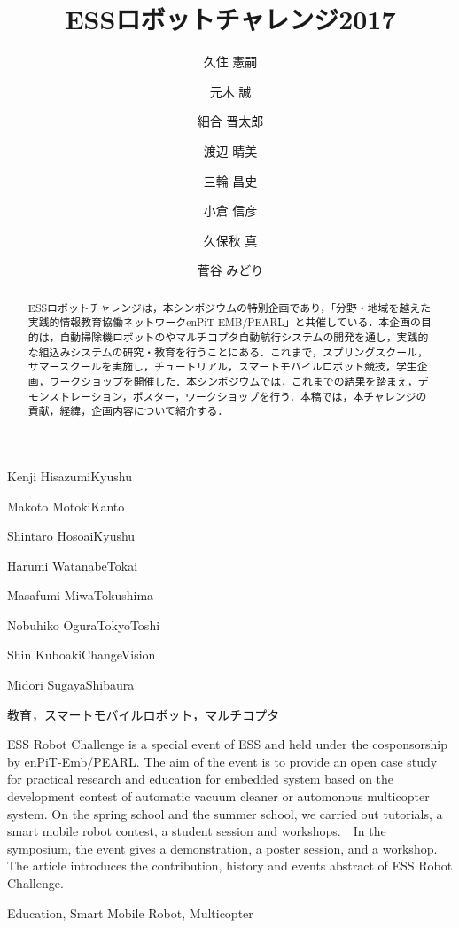 \documentclass[submit]{ipsj}
\begin{document}
\title{ESSロボットチャレンジ2017}



\author{久住 憲嗣}{Kenji Hisazumi}{Kyushu}
\author{元木 誠}{Makoto Motoki}{Kanto}
\author{細合 晋太郎}{Shintaro Hosoai}{Kyushu}
\author{渡辺 晴美}{Harumi Watanabe}{Tokai}
\author{三輪 昌史}{Masafumi Miwa}{Tokushima}
\author{小倉 信彦}{Nobuhiko Ogura}{TokyoToshi}
\author{久保秋 真}{Shin Kuboaki}{ChangeVision}
\author{菅谷 みどり}{Midori Sugaya}{Shibaura}


\begin{abstract}
ESSロボットチャレンジは，本シンポジウムの特別企画であり，「分野・地域を越えた実践的情報教育協働ネットワークenPiT-EMB/PEARL」と共催している．本企画の目的は，自動掃除機ロボットのやマルチコプタ自動航行システムの開発を通し，実践的な組込みシステムの研究・教育を行うことにある．これまで，スプリングスクール，サマースクールを実施し，チュートリアル，スマートモバイルロボット競技，学生企画，ワークショップを開催した．本シンポジウムでは，これまでの結果を踏まえ，デモンストレーション，ポスター，ワークショップを行う．本稿では，本チャレンジの貢献，経緯，企画内容について紹介する．
\end{abstract}

\begin{jkeyword}
教育，スマートモバイルロボット，マルチコプタ
\end{jkeyword}

\begin{eabstract}
ESS Robot Challenge is a special event of ESS and held under the cosponsorship by enPiT-Emb/PEARL. The aim of the event is to provide an open case study for practical research and education for embedded system based on the development contest of automatic vacuum cleaner or automonous multicopter system. On the spring school and the summer school, we carried out tutorials, a smart mobile robot contest, a student session and workshops.　In the symposium, the event gives a demonstration, a poster session, and a workshop. The article introduces the contribution, history and events abstract of ESS Robot Challenge.
\end{eabstract}

\begin{ekeyword}
Education, Smart Mobile Robot, Multicopter
\end{ekeyword}
\end{document}
